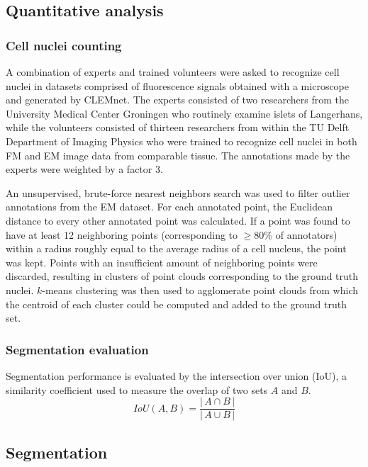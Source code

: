 \subsection{Quantitative analysis}
\label{sec:4methods_analysis}

\subsubsection{Cell nuclei counting}
A combination of experts and trained volunteers were asked to recognize cell nuclei in datasets comprised of fluorescence signals obtained with a microscope and generated by CLEMnet. The experts consisted of two researchers from the University Medical Center Groningen who routinely examine islets of Langerhans, while the volunteers consisted of thirteen researchers from within the TU Delft Department of Imaging Physics who were trained to recognize cell nuclei in both FM and EM image data from comparable tissue. The annotations made by the experts were weighted by a factor 3.

An unsupervised, brute-force nearest neighbors search was used to filter outlier annotations from the EM dataset. For each annotated point, the Euclidean distance to every other annotated point was calculated. If a point was found to have at least 12 neighboring points (corresponding to ${\ge}$80\% of annotators) within a radius roughly equal to the average radius of a cell nucleus, the point was kept. Points with an insufficient amount of neighboring points were discarded, resulting in clusters of point clouds corresponding to the ground truth nuclei. $k$-means clustering was then used to agglomerate point clouds from which the centroid of each cluster could be computed and added to the ground truth set.

\subsubsection{Segmentation evaluation}
Segmentation performance is evaluated by the intersection over union (IoU), a similarity coefficient used to measure the overlap of two sets $A$ and $B$.
%
\begin{equation}
    IoU(A, B) = \frac{\left|\,A \cap B\,\right|}{\left|\,A \cup B\,\right|}
\end{equation}



\subsection{Segmentation}
\label{sec:4methods_segmentation}

